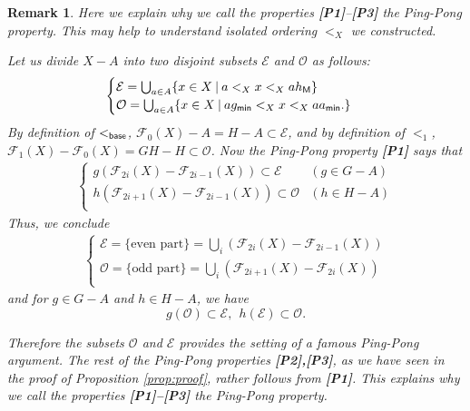 \documentclass[10pt]{amsart}
\newtheorem{remark}[theorem]{Remark}}
\numberwithin{equation}{section}
\begin{document}
\begin{remark}
\label{rem:ping-pong}
Here we explain why we call the properties {\bf [P1]}--{\bf [P3]} the Ping-Pong property. This may help to understand isolated ordering $<_{X}$ we constructed.

Let us divide $X-A$ into two disjoint subsets $\mathcal{E}$ and $\mathcal{O}$ as follows:
\begin{gather*}
\begin{cases}
\mathcal{E} =\bigcup_{a \in A}\{x \in X\: | \: a <_{X} x <_{X} ah_{\sf M} \}\\
\mathcal{O} =\bigcup_{a \in A}\{x \in X\: | \: ag_{\sf min} <_{X} x <_{X} aa_{\sf min}.\}
\end{cases}
\end{gather*}
By definition of $<_{\sf base}$, ${\mathcal{F}}_{0}(X)-A = H-A \subset \mathcal{E}$, and by definition of $<_{1}$, 
 ${\mathcal{F}}_{1}(X)-{\mathcal{F}}_{0}(X) = GH-H \subset \mathcal{O}$. Now the Ping-Pong property {\bf [P1]} says that 
\begin{gather*}
\begin{cases}
g({\mathcal{F}}_{2i}(X)-{\mathcal{F}}_{2i-1}(X)) \subset \mathcal{E} & (g \in G-A) \\
 h({\mathcal{F}}_{2i+1}(X)-{\mathcal{F}}_{2i-1}(X)) \subset \mathcal{O} & (h \in H-A) \\
\end{cases}
\end{gather*}
Thus, we conclude
\begin{gather*}
\begin{cases}
\mathcal{E}=\{\textrm{even part}\} = \bigcup_{i} ({\mathcal{F}}_{2i}(X)-{\mathcal{F}}_{2i-1}(X))\\
\mathcal{O}=\{\textrm{odd part}\} = \bigcup_{i} ({\mathcal{F}}_{2i+1}(X)-{\mathcal{F}}_{2i}(X))\\
\end{cases}
\end{gather*}
and for $g \in G-A$ and $h \in H-A$, we have
\[ g (\mathcal{O}) \subset \mathcal{E},\ \ h(\mathcal{E}) \subset \mathcal{O}. \] 

Therefore the subsets $\mathcal{O}$ and $\mathcal{E}$ provides the setting of a famous Ping-Pong argument. The rest of the Ping-Pong properties {\bf [P2],[P3]}, as we have seen in the proof of Proposition \ref{prop:proof}, rather follows from {\bf [P1]}. This explains why we call the properties {\bf [P1]--[P3]} the Ping-Pong property.
\end{remark}
\end{document}
